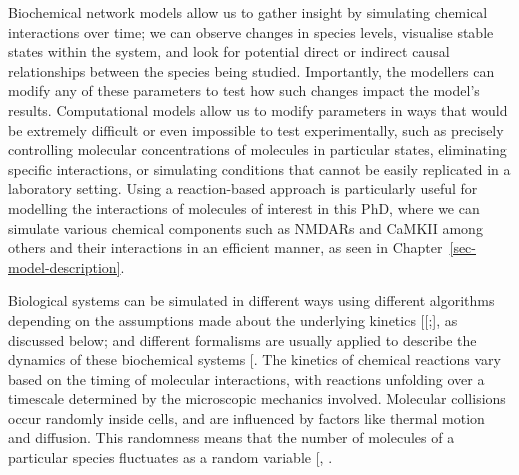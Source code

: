 \documentclass[
  11pt,
  letterpaper,
]{scrreprt}
\begin{document}
Biochemical network models allow us to gather insight by simulating
chemical interactions over time; we can observe changes in species
levels, visualise stable states within the system, and look for
potential direct or indirect causal relationships between the species
being studied. Importantly, the modellers can modify any of these
parameters to test how such changes impact the model's results.
Computational models allow us to modify parameters in ways that would be
extremely difficult or even impossible to test experimentally, such as
precisely controlling molecular concentrations of molecules in
particular states, eliminating specific interactions, or simulating
conditions that cannot be easily replicated in a laboratory setting.
Using a reaction-based approach is particularly useful for modelling the
interactions of molecules of interest in this PhD, where we can simulate
various chemical components such as NMDARs and CaMKII among others and
their interactions in an efficient manner, as seen in
Chapter~\ref{sec-model-description}.

Biological systems can be simulated in different ways using different
algorithms depending on the assumptions made about the underlying
kinetics {[}{[}\citeproc{ref-resat2009Kinetic}{269}{]};{]}, as discussed
below; and different formalisms are usually applied to describe the
dynamics of these biochemical systems
{[}\citeproc{ref-marchetti2017Simulation}{270}{]}. The kinetics of
chemical reactions vary based on the timing of molecular interactions,
with reactions unfolding over a timescale determined by the microscopic
mechanics involved. Molecular collisions occur randomly inside cells,
and are influenced by factors like thermal motion and diffusion. This
randomness means that the number of molecules of a particular species
fluctuates as a random variable
{[},
\citeproc{ref-earnest2018Simulating}{272}{]}.
\end{document}
